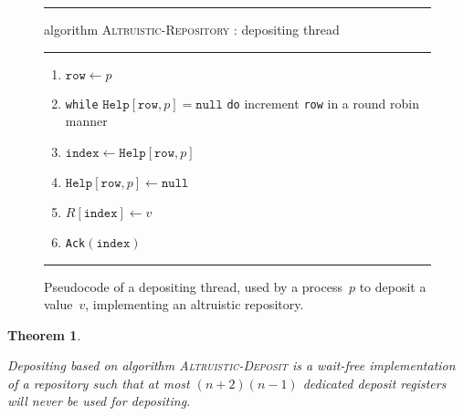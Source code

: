 \documentclass[11pt]{article}
\newcommand{\FF}{\vspace*{\medskipamount}}
\newtheorem{theorem}{Theorem}
\begin{document}
\begin{figure}[t]
\hrule

\FF

\textsf{algorithm} \textsc{Altruistic-Repository} : depositing thread

\FF

\hrule

\FF

\begin{enumerate}[nosep]
\item
$\texttt{row}\leftarrow p$
\item
\texttt{while} $\texttt{Help}[\texttt{row},p]=\texttt{null}$ \texttt{do}
increment \texttt{row} in a round robin manner
\item
$\texttt{index}\leftarrow \texttt{Help}[\texttt{row},p]$
\item
$\texttt{Help}[\texttt{row},p]\leftarrow \texttt{null}$
\item 
$R[\texttt{index}]\leftarrow v$
\item
\texttt{Ack}$(\texttt{index})$
\end{enumerate}
\FF

\hrule

\FF

\caption{\label{fig:alg-altruistic-repository-deposit}
Pseudocode of a depositing thread, used by a process~$p$ to deposit a value~$v$, implementing an altruistic repository.}
\end{figure}




\begin{theorem}
\label{thm:altruistic-deposit}

Depositing based on algorithm \textsc{Altruistic-Deposit} is a wait-free implementation of a repository such that at most $(n+2)(n-1)$ dedicated deposit registers will never be used for depositing.
\end{theorem}
\end{document}
